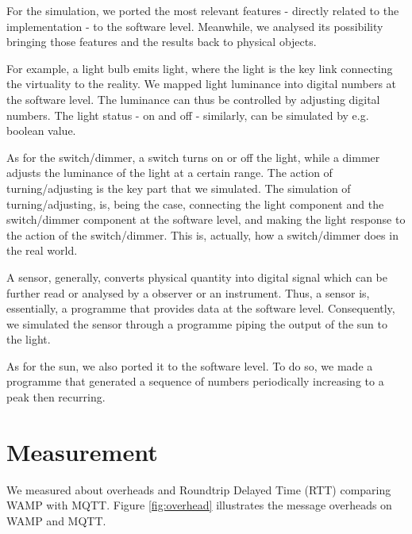 For the simulation, we ported the most relevant features - directly related to the implementation - to the software level. Meanwhile, we analysed its possibility bringing those features and the results back to physical objects. 

For example, a light bulb emits light, where the light is the key link connecting the virtuality to the reality. We mapped light luminance into digital numbers at the software level. The luminance can thus be controlled by adjusting digital numbers. The light status - on and off - similarly, can be simulated by e.g. boolean value. 

As for the switch/dimmer, a switch turns on or off the light, while a dimmer adjusts the luminance of the light at a certain range. The action of turning/adjusting is the key part that we simulated. The simulation of turning/adjusting, is, being the case, connecting the light component and the switch/dimmer component at the software level, and making the light response to the action of the switch/dimmer. This is, actually, how a switch/dimmer does in the real world.

A sensor, generally, converts physical quantity into digital signal which can be further read or analysed by a observer or an instrument. Thus, a sensor is, essentially, a programme that provides data at the software level. Consequently, we simulated the sensor through a programme piping the output of the sun to the light.

As for the sun, we also ported it to the software level. To do so, we made a programme that generated a sequence of numbers periodically increasing to a peak then recurring.

\section{Measurement}
We measured about overheads and Roundtrip Delayed Time (RTT) comparing WAMP with MQTT. Figure \ref{fig:overhead} illustrates the message overheads on WAMP and MQTT.

